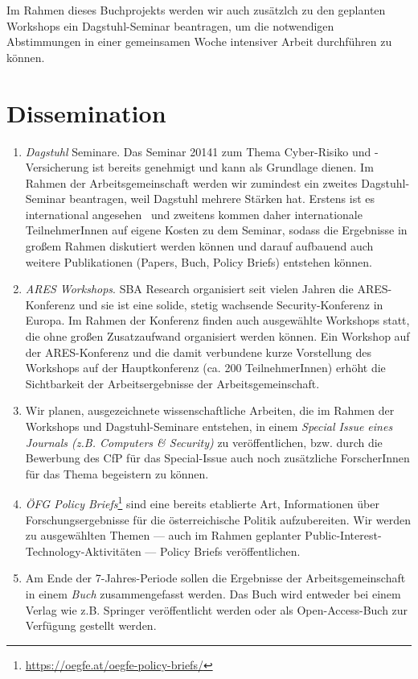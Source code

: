 \documentclass[11pt]{scrartcl}
\begin{document}
Im Rahmen dieses Buchprojekts werden wir auch zusätzlch zu den geplanten Workshops ein Dagstuhl-Seminar beantragen, um die notwendigen Abstimmungen in einer gemeinsamen Woche intensiver Arbeit durchführen zu können.

\section{Dissemination}

\begin{enumerate}
    \item \emph{Dagstuhl} Seminare. Das Seminar 20141 zum Thema Cyber-Risiko und -Versicherung ist bereits genehmigt und kann als Grundlage dienen. Im Rahmen der Arbeitsgemeinschaft werden wir zumindest ein zweites Dagstuhl-Seminar beantragen, weil Dagstuhl mehrere Stärken hat. Erstens ist es international angesehen~\cite{dagstuhl} und zweitens kommen daher internationale TeilnehmerInnen auf eigene Kosten zu dem Seminar, sodass die Ergebnisse in großem Rahmen diskutiert werden können und darauf aufbauend auch weitere Publikationen (Papers, Buch, Policy Briefs) entstehen können.
    \item \emph{ARES Workshops}. SBA Research organisiert seit vielen Jahren die ARES-Konferenz und sie ist eine solide, stetig wachsende Security-Konferenz in Europa. Im Rahmen der Konferenz finden auch ausgewählte Workshops statt, die ohne großen Zusatzaufwand organisiert werden können. Ein Workshop auf der ARES-Konferenz und die damit verbundene kurze Vorstellung des Workshops auf der Hauptkonferenz (ca. 200 TeilnehmerInnen) erhöht die Sichtbarkeit der Arbeitsergebnisse der Arbeitsgemeinschaft.
    \item Wir planen, ausgezeichnete wissenschaftliche Arbeiten, die im Rahmen der Workshops und Dagstuhl-Seminare entstehen, in einem \emph{Special Issue eines Journals (z.B. Computers \& Security)} zu veröffentlichen, bzw. durch die Bewerbung des CfP für das Special-Issue auch noch zusätzliche ForscherInnen für das Thema begeistern zu können.
    \item \emph{ÖFG Policy Briefs}\footnote{\url{https://oegfe.at/oegfe-policy-briefs/}} sind eine bereits etablierte Art, Informationen über Forschungsergebnisse für die österreichische Politik aufzubereiten. Wir werden zu ausgewählten Themen --- auch im Rahmen geplanter  Public-Interest-Technology-Aktivitäten --- Policy Briefs veröffentlichen. 
    \item Am Ende der 7-Jahres-Periode sollen die Ergebnisse der Arbeitsgemeinschaft in einem \emph{Buch} zusammengefasst werden. Das Buch wird entweder bei einem Verlag wie z.B. Springer veröffentlicht werden oder als Open-Access-Buch zur Verfügung gestellt werden. 
\end{enumerate}
\end{document}
